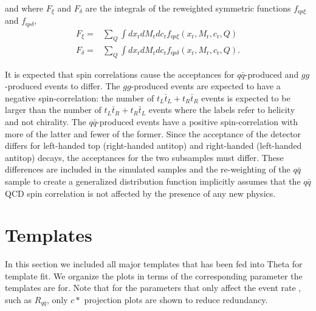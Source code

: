 and where $F_\xi$ and $F_\delta$ are the integrals of the reweighted symmetric functions $f_{\mathrm{qs}\xi}$ and $f_{\mathrm{qs}\delta}$,
\begin{align}
 F_{\xi}=& \sum_{Q}\int dx_\mathrm{r} dM_\mathrm{r} dc_\mathrm{r} f_{\mathrm{qs}\xi}(x_\mathrm{r}, M_\mathrm{r}, c_\mathrm{r},Q) \\
  F_{\delta}=& \sum_{Q}\int dx_\mathrm{r} dM_\mathrm{r} dc_\mathrm{r} f_{\mathrm{qs}\delta}(x_\mathrm{r}, M_\mathrm{r}, c_\mathrm{r},Q).
 \end{align}

It is expected that spin correlations cause the acceptances for $q\bar q$-produced and $gg$-produced events to differ.  The $gg$-produced events are expected to have a negative spin-correlation: the number of $t_L\bar t_L+t_R\bar t_R$ events is expected to be larger than the number of $t_L\bar t_R+t_R\bar t_L$ events where the labels refer to helicity and not chirality.  The $q\bar q$-produced events have a positive spin-correlation with more of the latter and fewer of the former.  Since the acceptance of the detector differs for left-handed top (right-handed antitop) and right-handed (left-handed antitop) decays, the acceptances for the two subsamples must differ.  These differences are included in the simulated samples and the re-weighting of the $q\bar q$ sample to create a generalized distribution function implicitly assumes that the $q\bar q$ QCD spin correlation is not affected by the presence of any new physics.


\clearpage

\section{Templates}
\label{sec:all templates}
In this section we included all major templates that has been fed into Theta for template fit. We organize the plots in terms of the corresponding parameter the templates are for. Note that for the parameters that only affect the event rate , such as $R_{q\bar q}$, only $c*$ projection plots are shown to reduce redundancy.
 
